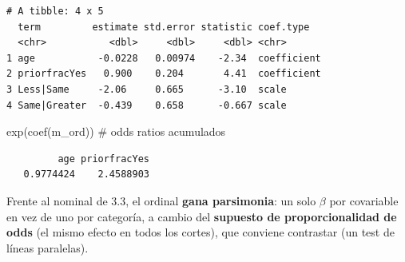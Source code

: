\documentclass[
  letterpaper,
  DIV=11,
  numbers=noendperiod]{scrartcl}
\newenvironment{Shaded}{\begin{snugshade}}{\end{snugshade}}
\newcommand{\CommentTok}[1]{\textcolor[rgb]{0.37,0.37,0.37}{#1}}
\newcommand{\FunctionTok}[1]{\textcolor[rgb]{0.28,0.35,0.67}{#1}}
\newcommand{\NormalTok}[1]{\textcolor[rgb]{0.00,0.23,0.31}{#1}}
\begin{document}
\begin{verbatim}
# A tibble: 4 x 5
  term         estimate std.error statistic coef.type  
  <chr>           <dbl>     <dbl>     <dbl> <chr>      
1 age           -0.0228   0.00974    -2.34  coefficient
2 priorfracYes   0.900    0.204       4.41  coefficient
3 Less|Same     -2.06     0.665      -3.10  scale      
4 Same|Greater  -0.439    0.658      -0.667 scale      
\end{verbatim}

\begin{Shaded}
\begin{Highlighting}[]
\FunctionTok{exp}\NormalTok{(}\FunctionTok{coef}\NormalTok{(m\_ord))      }\CommentTok{\# odds ratios acumulados}
\end{Highlighting}
\end{Shaded}

\begin{verbatim}
         age priorfracYes 
   0.9774424    2.4588903 
\end{verbatim}

Frente al nominal de 3.3, el ordinal \textbf{gana parsimonia}: un solo
\(\beta\) por covariable en vez de uno por categoría, a cambio del
\textbf{supuesto de proporcionalidad de odds} (el mismo efecto en todos
los cortes), que conviene contrastar (un test de líneas paralelas).
\end{document}

